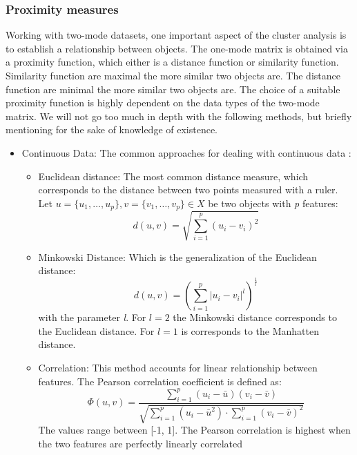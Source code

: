 \documentclass[a4paper,10pt]{article}
\theoremstyle{plain}
\theoremstyle{definition}
\begin{document}
\subsubsection{Proximity measures}
Working with two-mode datasets, one important aspect of the cluster analysis is to establish a relationship between objects. The one-mode matrix is obtained via a proximity function, which either is a distance function or similarity function. Similarity function are maximal the more similar two objects are. The distance function are minimal the more similar two objects are. The choice of a suitable proximity function is highly dependent on the data types of the two-mode matrix. We will not go too much in depth with the following methods, but briefly mentioning for the sake of knowledge of existence.
\begin{itemize}
	\item Continuous Data: The common approaches for dealing with continuous data \cite{clusteringOverview}:
		\begin{itemize}
			\item Euclidean distance: The most common distance measure, which corresponds to the distance between two points measured with a ruler. Let $u = \{ u_1, \dots, u_p \}, v = \{v_1, \dots, v_p\} \in X$ be two objects with \textit{p} features:
				\begin{equation*}
					d(u, v) = \sqrt{\sum_{i = 1}^{p} (u_i - v_i) ^2}
				\end{equation*}
			\item Minkowski Distance: Which is the generalization of the Euclidean distance:
				\begin{equation*}
					d(u, v) = (\sum_{i = 1}^{p} | u_i - v_i|^l)^{\frac{1}{l}}
				\end{equation*}
				with the parameter \textit{l}. For $l = 2$ the Minkowski distance corresponds to the Euclidean distance. For $l = 1$ is corresponds to the Manhatten distance.
			\item Correlation: This method accounts for linear relationship between features. The Pearson correlation coefficient is defined as:
				\begin{equation*}
					\Phi(u, v) = \frac{\sum_{i = 1}^{p} (u_i - \bar{u})(v_i - \bar{v})}{\sqrt{\sum_{i = 1}^{p}(u_i - \bar{u}^2) \cdot \sum_{i = 1}^{p}(v_i - \bar{v})^2}}
				\end{equation*}
				The values range between [-1, 1]. The Pearson correlation is highest when the two features are perfectly linearly correlated

\end{itemize}
\end{itemize}
\end{document}
